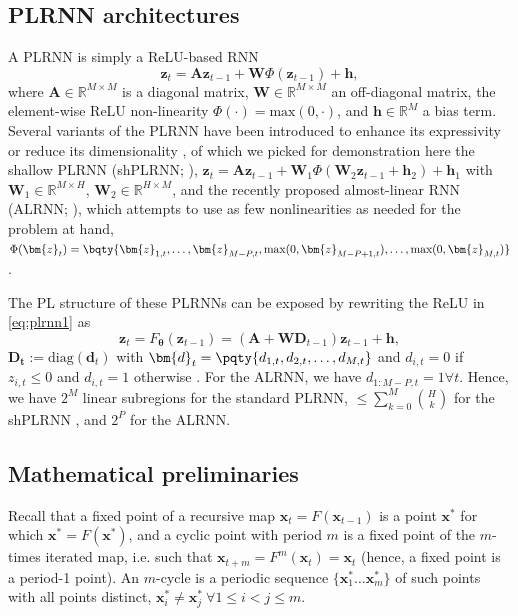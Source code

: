 \documentclass{article}
\theoremstyle{example}
\theoremstyle{plain}
\theoremstyle{definition}
\theoremstyle{remark}
\def\vd{{\bm{d}}}
\def\vh{{\bm{h}}}
\def\vx{{\bm{x}}}
\def\vz{{\bm{z}}}
\def\mA{{\bm{A}}}
\def\mD{{\bm{D}}}
\def\mW{{\bm{W}}}
\begin{document}
\subsection{PLRNN architectures}\label{sect:PLRNNs} 
A PLRNN \citep{dur} is simply a ReLU-based RNN 
\begin{equation}
        \vz_{t} = \mA \vz_{t-1} + \mW \Phi(\vz_{t-1})        + \vh ,
    \label{eq:plrnn1}
\end{equation}
where $\mA \in \mathbb{R} ^{M\times M}$ is a diagonal matrix, $\mW \in \mathbb{R} ^{M\times M}$ an off-diagonal matrix, the element-wise ReLU non-linearity $\Phi(\cdot)=\text{max}(0, \cdot)$, and \( \vh \in \mathbb{R} ^{M}\) a bias term. %
Several variants of the PLRNN have been introduced to enhance its expressivity or reduce its dimensionality \citep{brenner_tractable_2022}, of which we picked for demonstration here the shallow PLRNN (shPLRNN; \citep{hess}), $\vz_{t} = \mA \vz_{t-1} + \mW_1 \Phi(\mW_2 \vz_{t-1} +\vh_2) + \vh_1$ with %
$\mW_1 \in \mathbb{R} ^{M\times H}$, $\mW_2 \in \mathbb{R} ^{H\times M}$, and the recently proposed almost-linear RNN (ALRNN; \citep{brenner2024alrnn}), which attempts to use as few nonlinearities as needed for the problem at hand, $\Phi(\vz_t) = \bqty{\vz_{1,t}, \hdots, \vz_{M-P,t}, \text{max}(0, \vz_{M-P+1,t}), \hdots, \text{max}(0, \vz_{M,t})}$.%

The PL structure of these PLRNNs can be exposed by rewriting the ReLU in \cref{eq:plrnn1} as
\begin{equation}
\label{eq:PLRNN}
\vz_{t} = F_{\mathbf{\theta}}(\vz_{t-1}) = (\mA + \mW\mD_{t-1})\vz_{t-1} + \vh ,
\end{equation}
$\boldsymbol{D_{t}} := \text{diag}(\vd_{t})$ with $\vd_{t} = \pqty{d_{1,t}, d_{2,t}, \hdots, d_{M,t}}$ and $d_{i,t} = 0$ if $z_{i,t} \leq 0$ and $d_{i,t} = 1$ otherwise \citep{mon2}. For the ALRNN, we have $d_{1:M-P,t}=1 \forall t$. %
Hence, we have $2^M$ linear subregions for the standard PLRNN, 
$ \leq \sum^{M}_{k=0} \binom{H}{k} $ for the shPLRNN \citep{pals2024inferring}, and $2^P$ for the ALRNN.


\subsection{Mathematical preliminaries}\label{sec-math}
Recall that a fixed point of a recursive map $\vx_t=F(\vx_{t-1})$ is a point $\vx^*$ for which $\vx^*=F(\vx^*)$, and a cyclic point with period $m$ is a fixed point of the $m$-times iterated map, i.e. such that $\vx_{t+m}=F^m(\vx_t)=\vx_t$ (hence, a fixed point is a period-1 point). An $m$-cycle is a periodic sequence $\{\vx^*_{1} \dots \vx^*_{m}\}$ of such points with all points distinct, $\vx^*_{i} \neq \vx^*_{j} \ \forall 1 \leq i < j \leq m$.  
\end{document}
